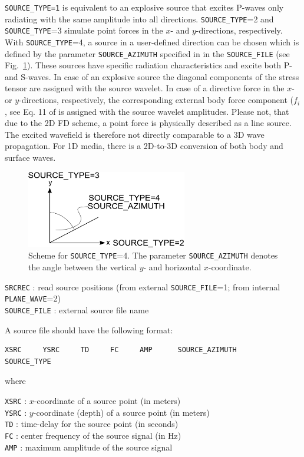\texttt{SOURCE\_TYPE=1} is equivalent to an explosive source that excites P-waves only radiating with the same amplitude into all directions. \texttt{SOURCE\_TYPE}=2 and \texttt{SOURCE\_TYPE}=3 simulate point forces in the $x$- and $y$-directions, respectively. With \texttt{SOURCE\_TYPE}=4, a source in a user-defined direction can be chosen which is defined by the parameter \texttt{SOURCE\_AZIMUTH} specified in in the \texttt{SOURCE\_FILE} (see Fig.~\ref{fig_source_azimuth}). These sources have specific radiation characteristics and excite both P- and S-waves. In case of an explosive source the diagonal components of the stress tensor are assigned with the source wavelet. In case of a directive force in the $x$- or $y$-directions, respectively, the corresponding external body force component ($f_i$, see Eq. 11 of \citep{bohlen:02} is assigned with the source wavelet amplitudes. Please not, that due to the 2D FD scheme, a point force is physically described as a line source. The excited wavefield is therefore not directly comparable to a 3D wave propagation. For 1D media, there is a 2D-to-3D conversion of both body and surface waves.
\begin{figure}[ht!]
\centering
    \includegraphics[width=7cm,angle=0]{figures/source_azimuth.pdf}
    \caption{Scheme for \texttt{SOURCE\_TYPE}=4. The parameter \texttt{SOURCE\_AZIMUTH} denotes the angle between the vertical $y$- and horizontal $x$-coordinate.}
    \label{fig_source_azimuth}
\end{figure}

\texttt{SRCREC} : read source positions (from external \texttt{SOURCE\_FILE}=1; from internal \texttt{PLANE\_WAVE}=2)\\
\texttt{SOURCE\_FILE} : external source file name

A source file should have the following format:
\begin{verbatim}
XSRC     YSRC     TD     FC     AMP      SOURCE_AZIMUTH     SOURCE_TYPE
\end{verbatim}

where

\texttt{XSRC} : $x$-coordinate of a source point (in meters)\\
\texttt{YSRC} : $y$-coordinate (depth) of a source point (in meters)\\
\texttt{TD} : time-delay for the source point (in seconds)\\
\texttt{FC} : center frequency of the source signal (in Hz)\\
\texttt{AMP} : maximum amplitude of the source signal

